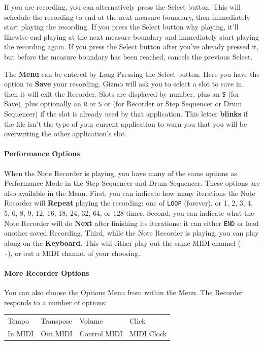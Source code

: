\documentclass{article}
\begin{document}
If you are recording, you can alternatively press the Select button.  This will schedule the recording to end at the next measure boundary, then immediately start playing the recording.  If you press the Select button why playing, it'll likewise end playing at the next measure boundary and immediately start playing the recording again.  If you press the Select button after you've already pressed it, but before the measure boundary has been reached, cancels the previous Select.

The {\bf Menu} can be entered by Long-Pressing the Select button.  Here you have the option to {\bf Save} your recording.  Gizmo will ask you to select a slot to save in, then it will exit the Recorder.  Slots are displayed by number, plus an \texttt{S} (for Save), plus optionally an \texttt{R} or \texttt{S} or  (for Recorder or Step Sequencer or Drum Sequencer) if the slot is already used by that application.  This letter {\bf blinks} if the file isn't the type of your current application to warn you that you will be overwriting the other application's slot.

\paragraph{Performance Options}  
When the Note Recorder is playing, you have many of the same options as Performance Mode in the Step Sequencer and Drum Sequencer.  These options are also available in the Menu.  First, you can indicate how many iterations the Note Recorder will {\bf Repeat} playing the recording: one of {\tt LOOP} (forever), or 1, 2, 3, 4, 5, 6, 8, 9, 12, 16, 18, 24, 32, 64, or 128 times.  Second, you can indicate what the Note Recorder will do {\bf Next} after finishing its iterations: it can either {\tt END} or load another saved Recording.  Third, while the Note Recorder is playing, you can play along on the {\bf Keyboard}.  This will either play out the same MIDI channel (\texttt{- - - -}), or out a MIDI channel of your choosing.

\paragraph{More Recorder Options}  
You can also choose the Options Menu from within the Menu.  The Recorder responds to a number of options:

\vspace{1em}
\begin{tabular}{llll}
Tempo&Transpose&Volume&Click\\
In MIDI& Out MIDI&Control MIDI&MIDI Clock\\
\end{tabular}
\end{document}
